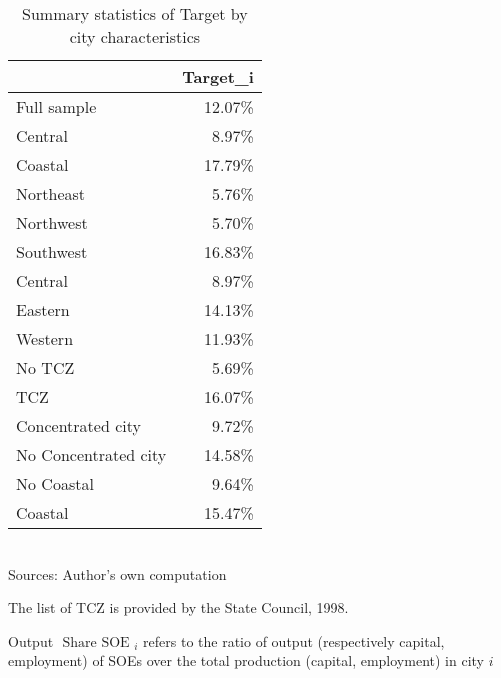 \documentclass[12pt]{article}
\begin{document}
\begin{table}\centering
\caption{Summary statistics of Target by city characteristics}
\label{table_1}
\begin{adjustbox}{width=\textwidth, totalheight=\baselineskip,keepaspectratio}
\begin{tabular}{lr}
\toprule
 & Target_i \\
\midrule
Full sample          &   12.07\% \\
Central              &    8.97\% \\
Coastal              &   17.79\% \\
Northeast            &    5.76\% \\
Northwest            &    5.70\% \\
Southwest            &   16.83\% \\
Central              &    8.97\% \\
Eastern              &   14.13\% \\
Western              &   11.93\% \\
No TCZ               &    5.69\% \\
TCZ                  &   16.07\% \\
Concentrated city    &    9.72\% \\
No Concentrated city &   14.58\% \\
No Coastal           &    9.64\% \\
Coastal              &   15.47\% \\
\bottomrule
\end{tabular}
\end{adjustbox}
\begin{tablenotes} 
 \small 
 \item \\ 

Sources: Author's own computation 

The list of TCZ is provided by the State Council, 1998. 

Output $\text { Share SOE }_{i}$ refers to the ratio of output
(respectively capital, employment) of SOEs over the total production
(capital, employment) in city $i$
      
 
\end{tablenotes}
\end{table}
\end{document}
